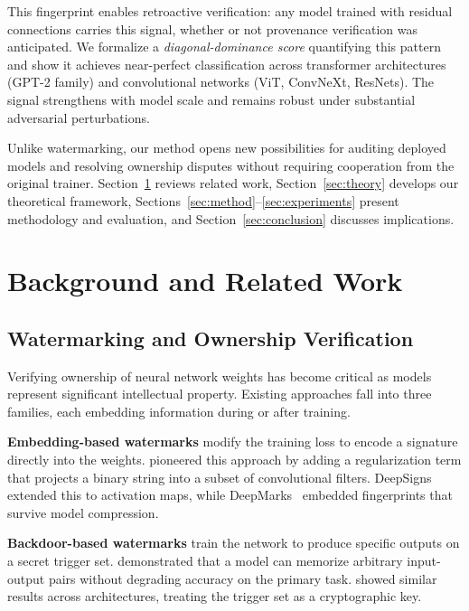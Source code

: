 \documentclass[wcp]{jmlr}
\begin{document}
This fingerprint enables retroactive verification: any model trained with residual connections carries this signal, whether or not provenance verification was anticipated. We formalize a \emph{diagonal-dominance score} quantifying this pattern and show it achieves near-perfect classification across transformer architectures (GPT-2 family) and convolutional networks (ViT, ConvNeXt, ResNets). The signal strengthens with model scale and remains robust under substantial adversarial perturbations.

Unlike watermarking, our method opens new possibilities for auditing deployed models and resolving ownership disputes without requiring cooperation from the original trainer. Section~\ref{sec:background} reviews related work, Section~\ref{sec:theory} develops our theoretical framework, Sections~\ref{sec:method}--\ref{sec:experiments} present methodology and evaluation, and Section~\ref{sec:conclusion} discusses implications.

\section{Background and Related Work}\label{sec:background}

\subsection{Watermarking and Ownership Verification}

Verifying ownership of neural network weights has become critical as models represent significant intellectual property. Existing approaches fall into three families, each embedding information during or after training.

\textbf{Embedding-based watermarks} modify the training loss to encode a signature directly into the weights. \citet{uchida2017embedding} pioneered this approach by adding a regularization term that projects a binary string into a subset of convolutional filters. DeepSigns~\citep{rouhani2019deepsigns} extended this to activation maps, while DeepMarks~\citep{chen2019deepmarks} embedded fingerprints that survive model compression.

\textbf{Backdoor-based watermarks} train the network to produce specific outputs on a secret trigger set. \citet{adi2018turning} demonstrated that a model can memorize arbitrary input-output pairs without degrading accuracy on the primary task. \citet{zhang2018protecting} showed similar results across architectures, treating the trigger set as a cryptographic key.
\end{document}
